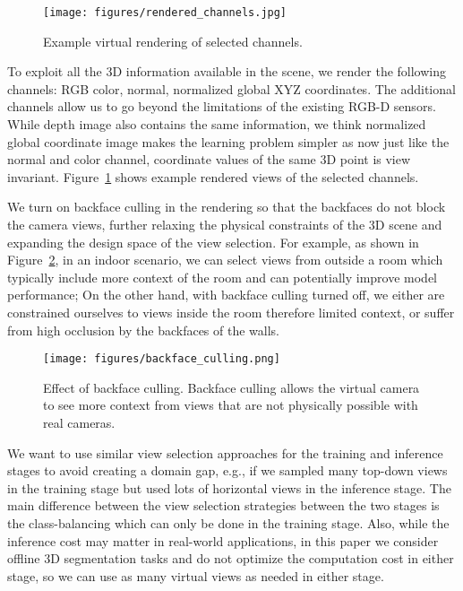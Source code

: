 \documentclass[runningheads]{llncs}
\begin{document}
\begin{figure}[t]
    \centering
    \texttt{[image: figures/rendered\_channels.jpg]}
    \caption{Example virtual rendering of selected channels.}
    \label{fig:rendered_channels}
\end{figure}

\vspace*{2mm} To exploit all the 3D information available in the scene, we render the following channels: RGB color, normal, normalized global XYZ coordinates. The additional channels allow us to go beyond the limitations of the existing RGB-D sensors. While depth image also contains the same information, we think normalized global coordinate image makes the learning problem simpler as now just like the normal and color channel, coordinate values of the same 3D point is view invariant. Figure~\ref{fig:rendered_channels} shows example rendered views of the selected channels.

\vspace*{2mm} We turn on backface culling in the rendering so that the backfaces do not block the camera views, further relaxing the physical constraints of the 3D scene and expanding the design space of the view selection. For example, as shown in Figure~\ref{fig:backface_culling}, in an indoor scenario, we can select views from outside a room which typically include more context of the room and can potentially improve model performance; On the other hand, with backface culling turned off, we either are constrained ourselves to views inside the room therefore limited context, or suffer from high occlusion by the backfaces of the walls.

\begin{figure}[t]
    \centering
    \texttt{[image: figures/backface\_culling.png]}
    \caption{Effect of backface culling. Backface culling allows the virtual camera to see more context from views that are not physically possible with real cameras.}
    \label{fig:backface_culling}
\end{figure}

\vspace*{2mm} We want to use similar view selection approaches for the training and inference stages to avoid creating a domain gap, e.g., if we sampled many top-down views in the training stage but used lots of horizontal views in the inference stage. The main difference between the view selection strategies between the two stages is the class-balancing which can only be done in the training stage. Also, while the inference cost may matter in real-world applications, in this paper we consider offline 3D segmentation tasks and do not optimize the computation cost in either stage, so we can use as many virtual views as needed in either stage.
\end{document}
